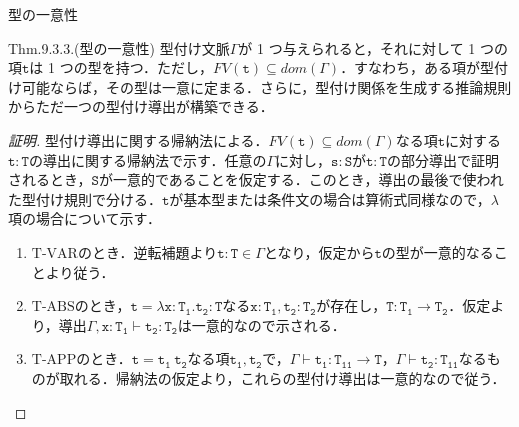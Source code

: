 \documentclass[9pt]{beamer}
\begin{document}
\begin{frame}{型の一意性}
\begin{alertblock}{Thm.9.3.3.(型の一意性)}
型付け文脈$\Gamma$が 1 つ与えられると，それに対して 1 つの項$\mathtt{t}$は 1 つの型を持つ．ただし，$\mathrel{FV}(\mathtt{t})\subseteq\mathrel{dom}(\Gamma)$．すなわち，ある項が型付け可能ならば，その型は一意に定まる．さらに，型付け関係を生成する推論規則からただ一つの型付け導出が構築できる．
\end{alertblock}
\begin{proof}[証明]
型付け導出に関する帰納法による．$\mathrel{FV}(\mathtt{t})\subseteq\mathrel{dom}(\Gamma)$なる項$\mathtt{t}$に対する$\mathtt{t:T}$の導出に関する帰納法で示す．任意の$\Gamma$に対し，$\mathtt{s:S}$が$\mathtt{t:T}$の部分導出で証明されるとき，$\mathtt{S}$が一意的であることを仮定する．このとき，導出の最後で使われた型付け規則で分ける．$\mathtt{t}$が基本型または条件文の場合は算術式同様なので，$\lambda$項の場合について示す．
\begin{enumerate}
\item $\mathrm{T}$-$\mathrm{VAR}$のとき．逆転補題より$\mathtt{t:T}\in\Gamma$となり，仮定から$\mathtt{t}$の型が一意的なることより従う．
\item $\mathrm{T}$-$\mathrm{ABS}$のとき，$\mathtt{t = \lambda x: T_{1}.t_{2}:T}$なる$\mathtt{x:T_{1}, t_{2}:T_{2}}$が存在し，$\mathtt{T:T_{1}\rightarrow T_{2}}$．仮定より，導出$\Gamma, \mathtt{x:T_{1}}\vdash \mathtt{t_{2}:T_{2}}$は一意的なので示される．
\item $\mathrm{T}$-$\mathrm{APP}$のとき．$\mathtt{t =t_{1}\ t_{2}}$なる項$\mathtt{t_{1}, t_{2}}$で，$\Gamma\vdash\mathtt{t_{1}:T_{11}\rightarrow T}$，$\Gamma\vdash\mathtt{t_{2}:T_{11}}$なるものが取れる．帰納法の仮定より，これらの型付け導出は一意的なので従う．
\end{enumerate}
\end{proof}
\end{frame}
\end{document}
